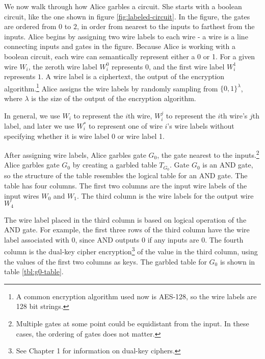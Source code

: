 



We now walk through how Alice garbles a circuit.
She starts with a boolean circuit, like the one shown in figure \ref{fig:labeled-circuit}.
In the figure, the gates are ordered from $0$ to $2$, in order from nearest to the inputs to farthest from the inputs.
Alice begins by assigning two wire labels to each wire - a wire is a line connecting inputs and gates in the figure.
Because Alice is working with a boolean circuit, each wire can semantically represent either a 0 or 1.
For a given wire $W_i$, the zeroth wire label $W_i^0$ represents $0$, and the first wire label $W_i^1$ represents $1$.
A wire label is a ciphertext, the output of the encryption algorithm.\footnote{A common encryption algorithm used now is AES-128, so the wire labels are 128 bit strings.}
Alice assigns the wire labels by randomly sampling from $\{0,1\}^{\lambda}$, where $\lambda$ is the size of the output of the encryption algorithm.

In general, we use $W_i$ to represent the $i$th wire, $W_i^j$ to represent the $i$th wire's $j$th label, and later we use $W_i^*$ to represent one of wire $i$'s wire labels without specifying whether it is wire label 0 or wire label 1.

After assigning wire labels, Alice garbles gate $G_0$, the gate nearest to the inputs.\footnote{Multiple gates at some point could be equidistant from the input. In these cases, the ordering of gates does not matter.}
Alice garbles gate $G_0$ by creating a garbled table $T_{G_0}$.
Gate $G_0$ is an AND gate, so the structure of the table resembles the logical table for an AND gate.
The table has four columns. 
The first two columns are the input wire labels of the input wires $W_0$ and $W_1$.
The third column is the wire labels for the output wire $W_4$

The wire label placed in the third column is based on logical operation of the AND gate.
For example, the first three rows of the third column have the wire label associated with $0$, since AND outputs 0 if any inputs are 0.
The fourth column is the dual-key cipher encryption\footnote{See Chapter 1 for information on dual-key ciphers.} of the value in the third column, using the values of the first two columns as keys.
The garbled table for $G_0$ is shown in table \ref{tbl:g0-table}.

